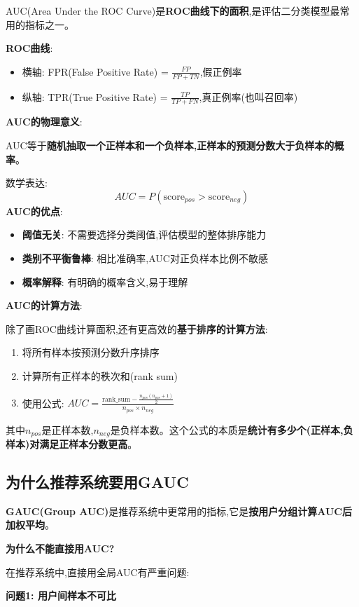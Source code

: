 \documentclass[UTF8]{ctexart}
\begin{document}
AUC(Area Under the ROC Curve)是\textbf{ROC曲线下的面积},是评估二分类模型最常用的指标之一。

\textbf{ROC曲线}:
\begin{itemize}
    \item 横轴: FPR(False Positive Rate) = $\frac{FP}{FP+TN}$,假正例率
    \item 纵轴: TPR(True Positive Rate) = $\frac{TP}{TP+FN}$,真正例率(也叫召回率)
\end{itemize}

\textbf{AUC的物理意义}:

AUC等于\textbf{随机抽取一个正样本和一个负样本,正样本的预测分数大于负样本的概率}。

数学表达:
$$AUC = P(\text{score}_{pos} > \text{score}_{neg})$$
\textbf{AUC的优点}:
\begin{itemize}
    \item \textbf{阈值无关}: 不需要选择分类阈值,评估模型的整体排序能力
    \item \textbf{类别不平衡鲁棒}: 相比准确率,AUC对正负样本比例不敏感
    \item \textbf{概率解释}: 有明确的概率含义,易于理解
\end{itemize}

\textbf{AUC的计算方法}:

除了画ROC曲线计算面积,还有更高效的\textbf{基于排序的计算方法}:
\begin{enumerate}
    \item 将所有样本按预测分数升序排序
    \item 计算所有正样本的秩次和(rank sum)
    \item 使用公式: $AUC = \frac{\text{rank\_sum} - \frac{n_{pos}(n_{pos}+1)}{2}}{n_{pos} \times n_{neg}}$
\end{enumerate}

其中$n_{pos}$是正样本数,$n_{neg}$是负样本数。这个公式的本质是\textbf{统计有多少个(正样本,负样本)对满足正样本分数更高}。

\subsection{为什么推荐系统要用GAUC}

\textbf{GAUC(Group AUC)}是推荐系统中更常用的指标,它是\textbf{按用户分组计算AUC后加权平均}。

\textbf{为什么不能直接用AUC?}

在推荐系统中,直接用全局AUC有严重问题:

\textbf{问题1: 用户间样本不可比}
\end{document}
